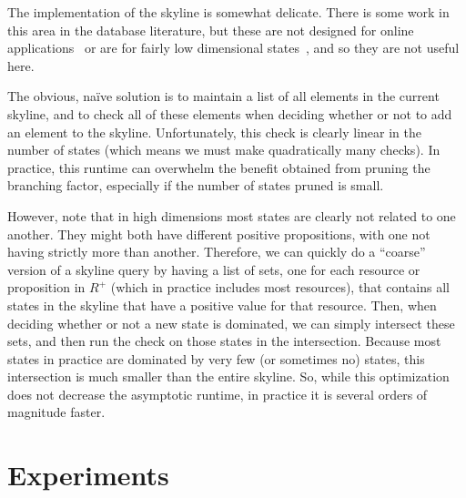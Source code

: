 \documentclass[letterpaper]{article}
\theoremstyle{plain} \newtheorem{theorem}{Theorem} \newtheorem{proposition}{Proposition} \newtheorem{lemma}{Lemma}
\theoremstyle{definition} \newtheorem{definition}{Definition} \newtheorem{conjecture}{Conjecture} \newtheorem*{example}{Example}
\theoremstyle{remark} \newtheorem*{remark}{Remark} \newtheorem*{note}{Note} \newtheorem{case}{Case}
\begin{document}
The implementation of the skyline is somewhat delicate.  There
is some work in this area in the database literature, but these are
not designed for online applications~\citep{skylineoperator,tan01efficient}
or are for fairly low dimensional states~\citep{KossmannRR02}, and
so they are not useful here.

The obvious, na\"ive solution is to maintain a list of all elements
in the current skyline, and to check all of these elements when
deciding whether or not to add an element to the skyline. Unfortunately,
this check is clearly linear in the number of states (which means
we must make quadratically many checks). In practice, this
runtime can overwhelm the benefit obtained from pruning the branching factor,
especially if the number of states pruned is small.


However, note that in high dimensions most states are clearly not
related to one another.  They might both have different positive
propositions, with one not having strictly more than another.
Therefore, we can quickly do a ``coarse'' version of a skyline query
by having a list of sets, one for each resource or proposition in $R^+$ (which in practice includes most resources),
that contains all states in the skyline that have a positive value
for that resource. Then, when deciding whether or not a new
state is dominated, we can simply intersect these sets, and then
run the check on those states in the intersection. Because most
states in practice are dominated by very few (or sometimes no)
states, this intersection is much smaller than the entire skyline.
So, while this optimization does not decrease the asymptotic runtime,
in practice it is several orders of magnitude faster.



\section{Experiments}
\end{document}
